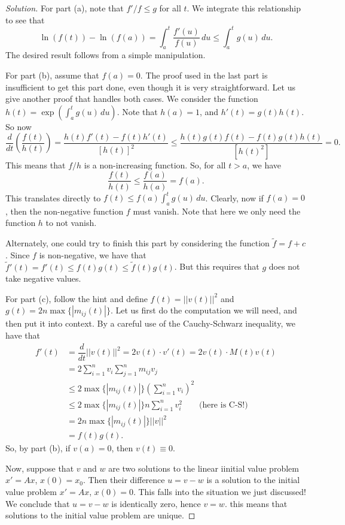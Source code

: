 \documentclass[Shifrin_Solutions_Spring_2018]{subfiles}
\begin{document}
\begin{proof}[Solution]
For part (a), note that $f'/f \leq g$ for all $t$. We integrate this relationship to see that
\[
\ln ( f(t) ) - \ln (f(a)) = \int_a^t \dfrac{f'(u)}{f(u)}\, du \leq \int_a^t g(u) \, du .
\]
The desired result follows from a simple manipulation.

For part (b), assume that $f(a) = 0$.  The proof used in the last part is insufficient to get this part done, even though it is very straightforward. Let us give another proof that handles both cases. We consider the function $h(t) = \exp\left(\int_a^t g(u)\, du\right)$. Note that $h(a) = 1$, and $h'(t) = g(t)h(t)$. So now
\[
\dfrac{d}{dt}\left( \dfrac{f(t)}{h(t)}\right) = \dfrac{h(t) f'(t) - f(t) h'(t)}{[h(t)]^2} \leq \dfrac{h(t)g(t)f(t) - f(t)g(t)h(t)}{[h(t)^2]} = 0.
\]
This means that $f/h$ is a non-increasing function. So, for all $t>a$, we have
\[
\dfrac{f(t)}{h(t)} \leq \dfrac{f(a)}{h(a)} = f(a).
\]
This translates directly to $f(t) \leq f(a) \int_a^t g(u)\, du $. Clearly, now if $f(a) = 0$, then the non-negative function $f$ must vanish. Note that here we only need the function $h$ to not vanish.

Alternately, one could try to finish this part by considering the function $\tilde{f} = f + c$. Since $f$ is non-negative, we have that
$\tilde{f}'(t) = f'(t) \leq f(t) g(t) \leq \tilde{f}(t)g(t)$. But this requires that $g$ does not take negative values.


For part (c), follow the hint and define $f(t) = ||v(t) ||^2$ and $g(t) = 2n \max\{|m_{ij}(t)|\}$.
Let us first do the computation we will need, and then put it into context. By a careful use of the Cauchy-Schwarz inequality, we have that
\[
\begin{split}
f'(t) & = \dfrac{d}{dt}||v(t)||^2 = 2v(t)\cdot v'(t) = 2 v(t) \cdot M(t) v(t) \\
	& = 2 \sum_{i=1}^n v_i \sum_{j=1}^n m_{ij}v_j \\
	& \leq 2 \max\{|m_{ij}(t)|\} \left(\sum_{i=1}^n v_i \right)^2 \\
	& \leq 2 \max\{|m_{ij}(t)|\} n \sum_{i=1}^n v_i^2  \qquad \mbox{(here is C-S!)} \\
	& = 2n \max\{|m_{ij}(t)|\} ||v||^2 \\
	& = f(t)g(t).
\end{split}
\]
So, by part (b), if $v(a)=0$, then $v(t) \equiv 0$.

Now, suppose that $v$ and $w$ are two solutions to the linear iinitial value problem $x' = A x$, $x(0)=x_0$. Then their difference $u = v - w$ is a solution to the initial value problem $x' = Ax$, $x(0) = 0$. This falls into the situation we just discussed! We conclude that $u = v-w$ is identically zero, hence $v=w$. this means that solutions to the initial value problem are unique.



\end{proof}
\end{document}
